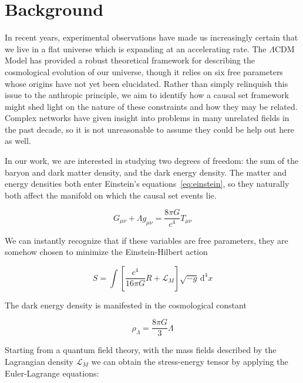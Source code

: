 \documentclass[preprint,notitlepage,amsmath,amssymb,floatfix]{revtex4-1}
\begin{document}
\section{Background}
In recent years, experimental observations have made us increasingly certain that we live in a flat universe which is expanding at an accelerating rate.  
The $\Lambda$CDM Model has provided a robust theoretical framework for describing the cosmological evolution of our universe, though it relies on six free parameters whose origins have not yet been elucidated.
Rather than simply relinquish this issue to the anthropic principle, we aim to identify how a causal set framework might shed light on the nature of these constraints and how they may be related.
Complex networks have given insight into problems in many unrelated fields in the past decade, so it is not unreasonable to assume they could be help out here as well. \par
In our work, we are interested in studying two degrees of freedom:  the sum of the baryon and dark matter density, and the dark energy density.  
The matter and energy densities both enter Einstein's equations~\eqref{eq:einstein}, so they naturally both affect the manifold on which the causal set events lie.

\begin{equation}
\label{eq:einstein}
G_{\mu\nu} + \Lambda g_{\mu\nu} = \frac{8\pi G}{c^4}T_{\mu\nu}
\end{equation}

\noindent We can instantly recognize that if these variables are free parameters, they are somehow chosen to minimize the Einstein-Hilbert action

\begin{equation}
\label{eq:EH_Action}
S = \int\!\left[\frac{c^4}{16\pi G}R+\mathcal{L}_M\right]\sqrt{-g}\, \mathrm d^4x
\end{equation}

\noindent The dark energy density is manifested in the cosmological constant

\begin{equation}
\label{eq:dark_energy_density}
\rho_\Lambda = \frac{8\pi G}{3}\Lambda
\end{equation}

\noindent Starting from a quantum field theory, with the mass fields described by the Lagrangian density $\mathcal{L}_M$ we can obtain the stress-energy tensor by applying the Euler-Lagrange equations:
\end{document}

